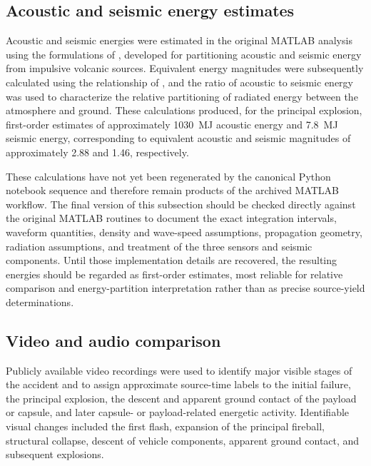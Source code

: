 \documentclass[]{seismica}
\begin{document}
\subsection{Acoustic and seismic energy estimates}

Acoustic and seismic energies were estimated in the original MATLAB analysis using the formulations of \citet{johnson_aster_2005}, developed for partitioning acoustic and seismic energy from impulsive volcanic sources. Equivalent energy magnitudes were subsequently calculated using the relationship of \citet{kanamori_1977}, and the ratio of acoustic to seismic energy was used to characterize the relative partitioning of radiated energy between the atmosphere and ground. These calculations produced, for the principal explosion, first-order estimates of approximately 1030~MJ acoustic energy and 7.8~MJ seismic energy, corresponding to equivalent acoustic and seismic magnitudes of approximately 2.88 and 1.46, respectively.

These calculations have not yet been regenerated by the canonical Python notebook sequence and therefore remain products of the archived MATLAB workflow. The final version of this subsection should be checked directly against the original MATLAB routines to document the exact integration intervals, waveform quantities, density and wave-speed assumptions, propagation geometry, radiation assumptions, and treatment of the three sensors and seismic components. Until those implementation details are recovered, the resulting energies should be regarded as first-order estimates, most reliable for relative comparison and energy-partition interpretation rather than as precise source-yield determinations.

\subsection{Video and audio comparison}

Publicly available video recordings were used to identify major visible stages
of the accident and to assign approximate source-time labels to the initial
failure, the principal explosion, the descent and apparent ground contact of
the payload or capsule, and later capsule- or payload-related energetic
activity. Identifiable visual changes included the first flash, expansion of
the principal fireball, structural collapse, descent of vehicle components,
apparent ground contact, and subsequent explosions.
\end{document}
